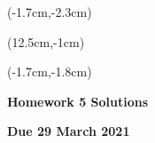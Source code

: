\documentclass[12pt, oneside]{article}
\begin{document}
\begin{textblock*}{4cm}(-1.7cm,-2.3cm)
\end{textblock*}

\begin{textblock*}{8cm}(12.5cm,-1cm)
\end{textblock*}
\begin{textblock*}{13.5cm}(-1.7cm,-1.8cm)
\end{textblock*}

\vspace{1cm}

\begin{center}
\textbf{\Large Homework 5 Solutions}

\textbf{Due 29 March 2021}
\end{center}
\end{document}

